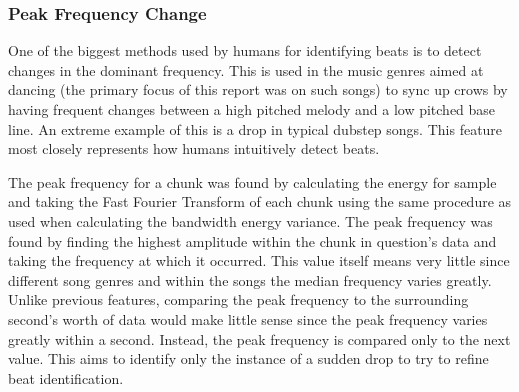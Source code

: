 \subsubsection{Peak Frequency Change}
One of the biggest methods used by humans for identifying beats is to detect changes in the dominant frequency. This is used in the music genres aimed at dancing (the primary focus of this report was on such songs) to sync up crows by having frequent changes between a high pitched melody and a low pitched base line. An extreme example of this is a drop in typical dubstep songs. This feature most closely represents how humans intuitively detect beats.

The peak frequency for a chunk was found by calculating the energy for sample and taking the Fast Fourier Transform of each chunk using the same procedure as used when calculating the bandwidth energy variance. The peak frequency was found by finding the highest amplitude within the chunk in question's data and taking the frequency at which it occurred. This value itself means very little since different song genres and within the songs the median frequency varies greatly. Unlike previous features, comparing the peak frequency to the surrounding second's worth of data would make little sense since the peak frequency varies greatly within a second. Instead, the peak frequency is compared only to the next value. This aims to identify only the instance of a sudden drop to try to refine beat identification.
